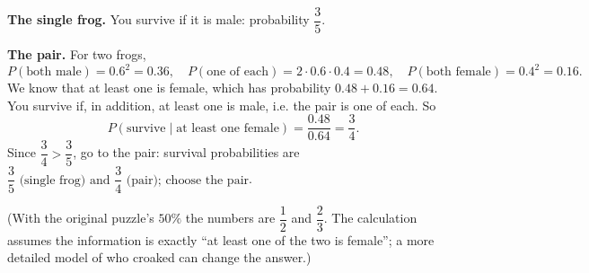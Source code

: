 \textbf{The single frog.} You survive if it is male: probability $\dfrac{3}{5}$.

\textbf{The pair.} For two frogs,
\[
P(\text{both male})=0.6^2=0.36,\quad P(\text{one of each})=2\cdot0.6\cdot0.4=0.48,\quad P(\text{both female})=0.4^2=0.16 .
\]
We know that at least one is female, which has probability $0.48+0.16=0.64$. You survive if, in addition, at least one is male, i.e. the pair is one of each. So
\[
P(\text{survive}\mid\text{at least one female})=\dfrac{0.48}{0.64}=\dfrac{3}{4} .
\]
Since $\dfrac{3}{4}>\dfrac{3}{5}$, go to the pair: survival probabilities are $\boxed{\dfrac{3}{5}\text{ (single frog) and }\dfrac{3}{4}\text{ (pair); choose the pair}}$.

(With the original puzzle's $50\%$ the numbers are $\dfrac{1}{2}$ and $\dfrac{2}{3}$. The calculation assumes the information is exactly ``at least one of the two is female''; a more detailed model of who croaked can change the answer.)
